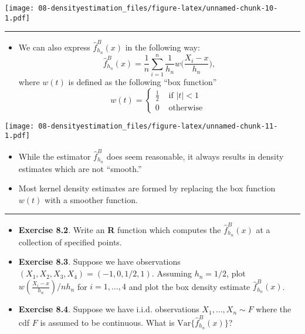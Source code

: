 \documentclass[]{book}
\providecommand{\tightlist}{%
  \setlength{\itemsep}{0pt}\setlength{\parskip}{0pt}}
\begin{document}
\texttt{[image: 08-densityestimation\_files/figure-latex/unnamed-chunk-10-1.pdf]}

\begin{center}\rule{0.5\linewidth}{\linethickness}\end{center}

\begin{itemize}
\tightlist
\item
  We can also express \(\hat{f}_{h_{n}}^{B}(x)\) in the following way:
  \begin{equation}
  \hat{f}_{h_{n}}^{B}(x)
  = \frac{1}{n} \sum_{i=1}^{n} \frac{1}{h_{n}} w\Big( \frac{X_{i} - x}{h_{n}} \Big),  
  \label{eq:box-density}
  \end{equation}
  where \(w(t)\) is defined as the following ``box function''
  \begin{equation}
  w(t) = 
  \begin{cases}
  \frac{1}{2} & \textrm{ if } |t| < 1 \nonumber \\
  0 & \textrm{ otherwise } \nonumber
  \end{cases}
  \end{equation}
\end{itemize}

\texttt{[image: 08-densityestimation\_files/figure-latex/unnamed-chunk-11-1.pdf]}

\begin{itemize}
\item
  While the estimator \(\hat{f}_{h_{n}}^{B}\) does seem reasonable, it always
  results in density estimates which are not ``smooth.''
\item
  Most kernel density estimates are formed by replacing the box function \(w(t)\) with
  a smoother function.
\end{itemize}

\begin{center}\rule{0.5\linewidth}{\linethickness}\end{center}

\begin{itemize}
\item
  \textbf{Exercise 8.2}. Write an \textbf{R} function which computes the \(\hat{f}_{h_{n}}^{B}(x)\)
  at a collection of specified points.
\item
  \textbf{Exercise 8.3}. Suppose we have observations \((X_{1}, X_{2}, X_{3}, X_{4}) = (-1, 0, 1/2, 1)\).
  Assuming \(h_{n} = 1/2\), plot \(w(\tfrac{X_{i} - x}{h_{n}})/nh_{n}\) for \(i = 1, \ldots, 4\) and plot the box
  density estimate \(\hat{f}_{h_{n}}^{B}(x)\).
\item
  \textbf{Exercise 8.4}. Suppose we have i.i.d. observations \(X_{1}, \ldots, X_{n} \sim F\) where
  the cdf \(F\) is assumed to be continuous. What is \(\textrm{Var}\{ \hat{f}_{h_{n}}^{B}(x) \}\)?
\end{itemize}
\end{document}
